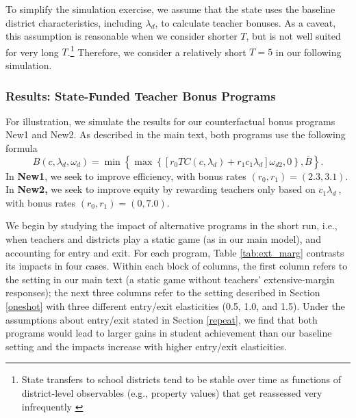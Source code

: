 \documentclass[notitlepage,12pt]{article}%
\begin{document}
To simplify the simulation exercise, we assume that the state uses the
baseline district characteristics, including $\lambda_{d}$, to calculate
teacher bonuses. As a caveat, this assumption is reasonable when we consider
shorter $T$, but is not well suited for very long $T$.\footnote{State
transfers to school districts tend to be stable over time as functions of
district-level observables (e.g., property values) that get reassessed very
infrequently \citep{biasi2023school}} Therefore, we consider a relatively
short $T=5$ in our following simulation.

\subsubsection{Results: State-Funded Teacher Bonus Programs}

For illustration, we simulate the results for our counterfactual bonus
programs New1 and New2. As described in the main text, both programs use the
following formula%
\begin{equation}
B\left(  c,\lambda_{d},\omega_{d}\right)  =\min\left\{  \max\left\{  \left[
r_{0}TC\left(  c,\lambda_{d}\right)  +r_{1}c_{1}\lambda_{d}\right]
\omega_{d2},0\right\}  ,\overline{B}\right\}  . \tag{B}%
\end{equation}
In \textbf{New1}, we seek to improve efficiency, with bonus rates
$(r_{0},r_{1})=\left(  2.3,3.1\right)  .$ In \textbf{New2,} we seek to improve
equity by rewarding teachers only based on $c_{1}\lambda_{d}\ ,$ with bonus
rates $\left(  r_{0},r_{1}\right)  =\left(  0,7.0\right)  $.

We begin by studying the impact of alternative programs in the short run,
i.e., when teachers and districts play a static game (as in our main model),
and accounting for entry and exit. For each program, Table \ref{tab:ext_marg}
contrasts its impacts in four cases. Within each block of columns, the first
column refers to the setting in our main text (a static game without teachers'
extensive-margin responses); the next three columns refer to the setting
described in Section \ref{oneshot} with three different entry/exit
elasticities (0.5, 1.0, and 1.5). Under the assumptions about entry/exit
stated in Section \ref{repeat}, we find that both programs would lead to
larger gains in student achievement than our baseline setting and the impacts
increase with higher entry/exit elasticities.
\end{document}
